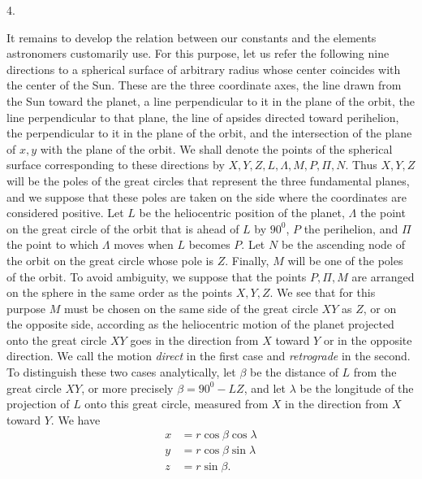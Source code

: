 \par{}\bigskip
{}
\begin{center}4.\end{center}
\noindent\hspace*{\parindent}It remains to develop the relation between our constants and the elements astronomers customarily use. For this purpose, let us refer the following nine directions to a spherical surface of arbitrary radius whose center coincides with the center of the Sun. These are the three coordinate axes, the line drawn from the Sun toward the planet, a line perpendicular to it in the plane of the orbit, the line perpendicular to that plane, the line of apsides directed toward perihelion, the perpendicular to it in the plane of the orbit, and the intersection of the plane of \(x,y\) with the plane of the orbit. We shall denote the points of the spherical surface corresponding to these directions by \(X,Y,Z,L,\Lambda,M,P,\Pi,N\). Thus \(X,Y,Z\) will be the poles of the great circles that represent the three fundamental planes, and we suppose that these poles are taken on the side where the coordinates are considered positive. Let \(L\) be the heliocentric position of the planet, \(\Lambda\) the point on the great circle of the orbit that is ahead of \(L\) by \(90^{0}\), \(P\) the perihelion, and \(\Pi\) the point to which \(\Lambda\) moves when \(L\) becomes \(P\). Let \(N\) be the ascending node of the orbit on the great circle whose pole is \(Z\). Finally, \(M\) will be one of the poles of the orbit. To avoid ambiguity, we suppose that the points \(P,\Pi,M\) are arranged on the sphere in the same order as the points \(X,Y,Z\). We see that for this purpose \(M\) must be chosen on the same side of the great circle \(XY\) as \(Z\), or on the opposite side, according as the heliocentric motion of the planet projected onto the great circle \(XY\) goes in the direction from \(X\) toward \(Y\) or in the opposite direction. We call the motion \textit{direct} in the first case and \textit{retrograde} in the second. To distinguish these two cases analytically, let \(\beta\) be the distance of \(L\) from the great circle \(XY\), or more precisely \(\beta=90^{0}-LZ\), and let \(\lambda\) be the longitude of the projection of \(L\) onto this great circle, measured from \(X\) in the direction from \(X\) toward \(Y\). We have
\[
\begin{aligned}
x&=r\cos\beta\cos\lambda\\
y&=r\cos\beta\sin\lambda\\
z&=r\sin\beta.
\end{aligned}
\]
